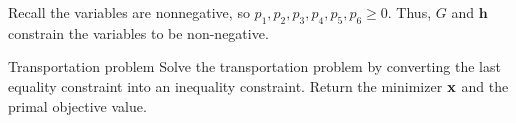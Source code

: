 Recall the variables are nonnegative, so $p_1,p_2,p_3,p_4,p_5,p_6\geq 0$.
Thus, $G$ and $\mathbf{h}$ constrain the variables to be non-negative.
%
%
%
%
%
\begin{problem}{Transportation problem}{}
Solve the transportation problem by converting the last equality constraint into an inequality constraint.
Return the minimizer $\mathbf{x}$ and the primal objective value.
\end{problem}

